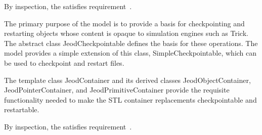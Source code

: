 By inspection, the \ModelDesc satisfies
requirement~.

\label{inspect:chkpt}

The primary purpose of the model is to provide a basis for checkpointing and
restarting objects whose content is opaque to simulation engines such as Trick.
The abstract class JeodCheckpointable defines the basis for these operations.
The model provides a simple extension of this class, SimpleCheckpointable,
which can be used to checkpoint and restart files.

The template class
JeodContainer and its derived classes JeodObjectContainer, JeodPointerContainer,
and JeodPrimitiveContainer provide the requisite functionality needed to
make the STL container replacements checkpointable and restartable.

By inspection, the \ModelDesc satisfies
requirement~.

